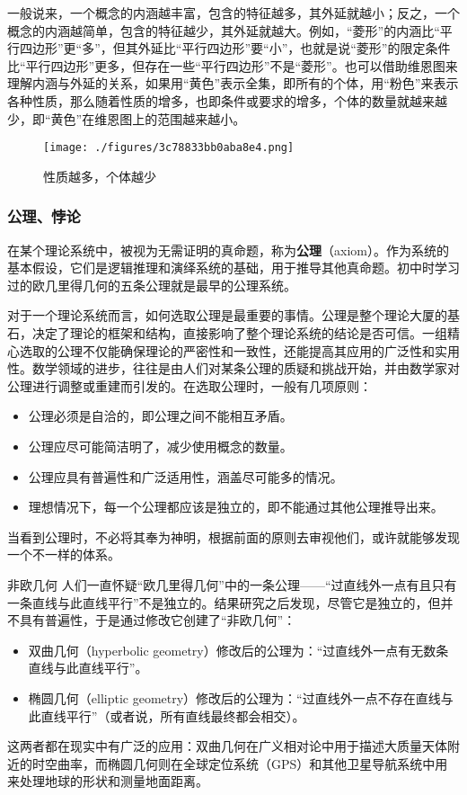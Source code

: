 一般说来，一个概念的内涵越丰富，包含的特征越多，其外延就越小；反之，一个概念的内涵越简单，包含的特征越少，其外延就越大。例如，“菱形”的内涵比“平行四边形”更“多”，但其外延比“平行四边形”要“小”，也就是说“菱形”的限定条件比“平行四边形”更多，但存在一些“平行四边形”不是“菱形”。也可以借助维恩图来理解内涵与外延的关系，如果用“黄色”表示全集，即所有的个体，用“粉色”来表示各种性质，那么随着性质的增多，也即条件或要求的增多，个体的数量就越来越少，即“黄色”在维恩图上的范围越来越小。
\begin{figure}[ht]
\centering
\texttt{[image: ./figures/3c78833bb0aba8e4.png]}
\caption{性质越多，个体越少} \label{fig_SufCnd_6}
\end{figure}

\subsubsection{公理、悖论}

在某个理论系统中，被视为无需证明的真命题，称为\textbf{公理}（axiom）。作为系统的基本假设，它们是逻辑推理和演绎系统的基础，用于推导其他真命题。初中时学习过的欧几里得几何的五条公理就是最早的公理系统。

对于一个理论系统而言，如何选取公理是最重要的事情。公理是整个理论大厦的基石，决定了理论的框架和结构，直接影响了整个理论系统的结论是否可信。一组精心选取的公理不仅能确保理论的严密性和一致性，还能提高其应用的广泛性和实用性。数学领域的进步，往往是由人们对某条公理的质疑和挑战开始，并由数学家对公理进行调整或重建而引发的。在选取公理时，一般有几项原则：

\begin{itemize}
\item 公理必须是自洽的，即公理之间不能相互矛盾。
\item 公理应尽可能简洁明了，减少使用概念的数量。
\item 公理应具有普遍性和广泛适用性，涵盖尽可能多的情况。
\item 理想情况下，每一个公理都应该是独立的，即不能通过其他公理推导出来。
\end{itemize}

当看到公理时，不必将其奉为神明，根据前面的原则去审视他们，或许就能够发现一个不一样的体系。

\begin{example}{非欧几何}
人们一直怀疑“欧几里得几何”中的一条公理——“过直线外一点有且只有一条直线与此直线平行”不是独立的。结果研究之后发现，尽管它是独立的，但并不具有普遍性，于是通过修改它创建了“非欧几何”：

\begin{itemize}
\item 双曲几何（hyperbolic geometry）修改后的公理为：“过直线外一点有无数条直线与此直线平行”。
\item 椭圆几何（elliptic geometry）修改后的公理为：“过直线外一点不存在直线与此直线平行”（或者说，所有直线最终都会相交）。
\end{itemize}

这两者都在现实中有广泛的应用：双曲几何在广义相对论中用于描述大质量天体附近的时空曲率，而椭圆几何则在全球定位系统（GPS）和其他卫星导航系统中用来处理地球的形状和测量地面距离。
\end{example}

